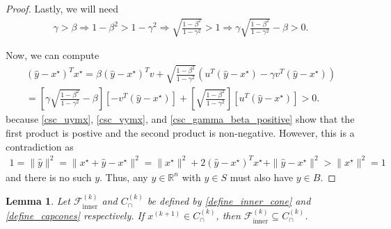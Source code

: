 \documentclass{article}
\newtheorem{lemma}[theorem]{Lemma}
\theoremstyle{case}
\numberwithin{theorem}{subsection}
\newcommand{\capcones}{{C^{(k)}_{\cap}}}
\newcommand{\dk}{\Delta_k}
\newcommand{\fcki}{{\mathcal {F}^{(k)}_{\textrm{inner}}}}
\newcommand{\Rn}{\mathbb R^n}
\newcommand{\xkpo}{{{x}^{(k+1)}}}
\begin{document}
\begin{proof}
Lastly, we will need
\begin{align}
\gamma > \beta 
\Longrightarrow 1 - \beta^2 > 1 - \gamma^2
\Longrightarrow \sqrt{\frac{1 - \beta^2}{1 - \gamma^2}} > 1
\Longrightarrow \gamma \sqrt{\frac{1 - \beta^2}{1 - \gamma^2}} - \beta > 0. \label{csc_gamma_beta_positive}
\end{align}

Now, we can compute
\begin{align*}
{\left(\hat y - x^{\star}\right)}^Tx^{\star} = 
\beta {\left(\hat y - x^{\star}\right)}^Tv
+ \sqrt{\frac{1 - \beta^2}{1 - \gamma^2}} 
\left(u^T\left(\hat y - x^{\star}\right) - \gamma v^T \left(\hat y - x^{\star}\right) \right)\\ 
= \left[\gamma \sqrt{\frac{1 - \beta^2}{1 - \gamma^2}} - \beta\right] \left[-v^T\left(\hat y - x^{\star}\right)\right]
+ \left[\sqrt{\frac{1 - \beta^2}{1 - \gamma^2}}\right] \left[u^T\left(\hat y - x^{\star}\right) \right] > 0.
\end{align*}
because \cref{csc_uymx}, \cref{csc_vymx}, and \cref{csc_gamma_beta_positive} show that the first product is postive and the second product is non-negative.
However, this is a contradiction as
\begin{align*}
1 = \|\hat y\|^2 = \|x^{\star} + \hat y - x^{\star}\|^2 = \|x^{\star}\|^2 + 2{\left(\hat y - x^{\star}\right)}^Tx^{\star} + \|\hat y - x^{\star}\|^2 > \|x^{\star}\|^2 = 1
\end{align*}
and there is no such $y$.
Thus, any $y \in\Rn$ with $y \in S$ must also have $y \in B$.
\end{proof}


\begin{lemma}
\label{inner_cone_inside_each_cone}
Let $\fcki$ and $\capcones$ be defined by \cref{define_inner_cone} and \cref{define_capcones} respectively.
If 
$\xkpo \in \capcones$, then $\fcki \subseteq \capcones$.
\end{lemma}
\end{document}
